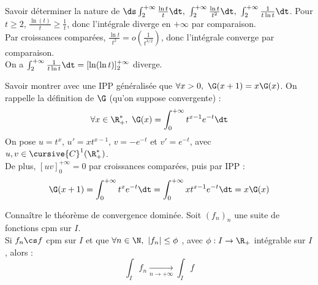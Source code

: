 \documentclass[french, 11pt]{article}
\begin{document}
\vspace*{-0.8cm}

\begin{question}{}{}
    Savoir déterminer la nature de $\ds\int_2^{+\infty}\frac{\ln t}{t}\dt, ~ \int_2^{+\infty}\frac{\ln t}{t^2}\dt, ~ \int_2^{+\infty}\frac{1}{t\ln t}\dt$.
    \tcblower
     Pour $t\geq 2$, $\frac{\ln(t)}{t}\geq \frac{1}{t}$, donc l'intégrale diverge en $+\infty$ par comparaison. \\
     Par croissances comparées, $\frac{\ln t}{t^2} = o\left( \frac{1}{t^{3/2}} \right)$, donc l'intégrale converge par comparaison.\\
     On a $\int_2^{+\infty}\frac{1}{t\ln t}\dt = [\ln(\ln t)]_2^{+\infty}$ diverge.
\end{question}

\pagebreak

\begin{question}{}{}
    Savoir montrer avec une IPP généralisée que $\forall x > 0, ~ \G(x+1)=x\G(x)$.
    \tcblower
    On rappelle la définition de $\G$ (qu'on suppose convergente) :
    \begin{equation*}
        \forall x \in \R_+^*, ~ \G(x) = \int_0^{+\infty} t^{x-1}e^{-t}\dt
    \end{equation*}
    On pose $u=t^{x}$, $u'=xt^{x-1}$, $v=-e^{-t}$ et $v'=e^{-t}$, avec $u,v\in\cursive{C}^1(\R_+^*)$.\\
    De plus, $[uv]_0^{+\infty}=0$ par croissances comparées, puis par IPP :
    \begin{equation*}
        \G(x+1) = \int_0^{+\infty}t^{x}e^{-t}\dt = \int_0^{+\infty}xt^{x-1}e^{-t}\dt = x\G(x)
    \end{equation*}
\end{question}

\vspace*{-0.8cm}

\begin{question}{}{}
    Connaître le théorème de convergence dominée.
    \tcblower
    Soit $(f_n)_n$ une suite de fonctions cpm sur $I$.\\
    Si $f_n \cs f$ cpm sur $I$ et que $\forall n \in \N, ~ |f_n|\leq \phi$ , avec $\phi:I\to\R_+$ intégrable sur $I$, alors :
    \begin{equation*}
        \int_I f_n \xrightarrow[n\to+\infty]{} \int_I f
    \end{equation*}
\end{question}

\vspace*{-0.8cm}
\end{document}
